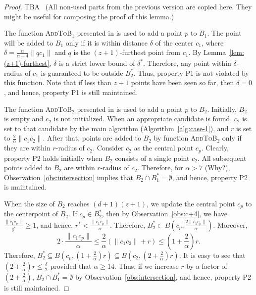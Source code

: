 \documentclass[envcountsame]{cls/cccg15}
\newcommand{\rc}{r}
\newcommand{\cp}{c_p}
\newcommand{\dz}{(d + 1)(z + 1)}
\newcommand{\textproc}{\textsc}
\newcommand{\len}[1]{\|{#1}\|}
\newcommand{\lee}{\leqslant}
\newcommand{\gee}{\geqslant}
\renewcommand{\leq}{\lee}
\renewcommand{\le}{\lee}
\renewcommand{\geq}{\gee}
\renewcommand{\ge}{\gee}
\begin{document}
\begin{proof}
TBA \ 
(All non-used parts from the previous version are copied here.
They might be useful for composing the proof of this lemma.)

The function \textproc{AddToB$_1$} presented in  
is used to add a point $p$ to $B_1$. 
The point will be added to $B_1$ only if it is within distance $\delta$ of the center $c_1$, 
where $\delta = \frac{\alpha}{\alpha+4}\len{qc_1}$ 
and $q$ is the $(z+1)$-furthest point from $c_1$.
By Lemma~\ref{lem:(z+1)-furthest}, $\delta$ is a strict lower bound of $\delta^*$. 
Therefore, any point within $\delta$-radius of $c_1$ is guaranteed to be outside $B_2^*$. 
Thus, property P1 is not violated by this function.
Note that if less than $z+1$ points have been seen so far,
then $\delta = 0$, %
and hence, property P1 is still maintained.


The function \textproc{AddToB$_2$} presented in 
is used to add a point $p$ to $B_2$.
Initially, $B_2$ is empty and $c_2$ is not initialized. 
When an appropriate candidate is found, 
$c_2$ is set to that candidate by the main algorithm (Algorithm~\ref{alg:case-1}),
and $\rc$ is set to $\frac{2}{\alpha}\len{c_1c_2}$.
After that, points are added to $B_2$ by function \textproc{AddToB$_2$}
only if they are within $\rc$-radius of $c_2$. 
Consider $c_2$ as the central point $c_p$. %
Clearly, property P2 holds initially when $B_2$ consists of a single point $c_2$. 
All subsequent points added to $B_2$ are within $\rc$-radius of $c_2$.
Therefore, for $\alpha > 7$ (Why?), Observation~\ref{obs:intersection}
implies that $B_2 \cap B_1^* = \emptyset$,
and hence, property P2 is maintained. %


When the size of $B_2$ reaches $\dz$, 
we update the central point $\cp$ to the centerpoint of $B_2$.
If $\cp \in B_2^*$, then by Observation~\ref{obs:c+4},
we have $\frac{\len{c_1\cp}}{\delta^*} \geq 1$,
and hence, $r^* < \frac{\len{c_1\cp}}{\alpha}$. 
Therefore, $B_2^* \subset B(\cp, \frac{2\len{c_1\cp}}{\alpha})$.
Moreover,
\[
	2 \cdot \frac{\len{c_1\cp}}{\alpha} \leq \frac{2}{\alpha}(\len{c_1c_2} + \rc ) 
	\leq (1 + \frac{2}{\alpha})\rc.
\]
Therefore, $B_2^* \subseteq B(c_p, (1 + \frac{2}{\alpha})\rc )
\subseteq B(c_2, (2 + \frac{2}{\alpha})\rc )$. 
It is easy to see that $(2 + \frac{2}{\alpha})\rc  \le \frac{\delta}{2}$ provided that $\alpha \ge 14$.
Thus, if we increase $\rc$ by a factor of $(2 + \frac{2}{\alpha})$, 
$B_2 \cap B_1^* = \emptyset$
by Observation~\ref{obs:intersection}, and hence,
property P2 is still maintained. 


\end{proof}
\end{document}
